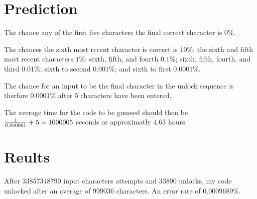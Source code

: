 \documentclass[letterpaper,10pt]{article}
\date{11/15/22}
\begin{document}
\section{Prediction}

The chance any of the first five characters the final correct character is $0\%$.

The chances the sixth most recent character is correct is $10\%$; the sixth and fifth most recent characters $1\%$; sixth, fifth, and fourth $0.1\%$; sixth, fifth, fourth, and third $0.01\%$; sixth to second $0.001\%$; and sixth to first $0.0001\%$.

The chance for an input to be the final character in the unlock sequence is therfore $0.0001\%$ after $5$ characters have been entered.

The average time for the code to be guessed should then be ${1\over0.000001}+5=1000005$ seconds or approximatly $4.63$ hours.

\section{Reults}

After 33857348790 input characters attempts and 33890 unlocks, my code unlocked after an average of 999036 characters. An error rate of 0.0009689\%.
\end{document}
